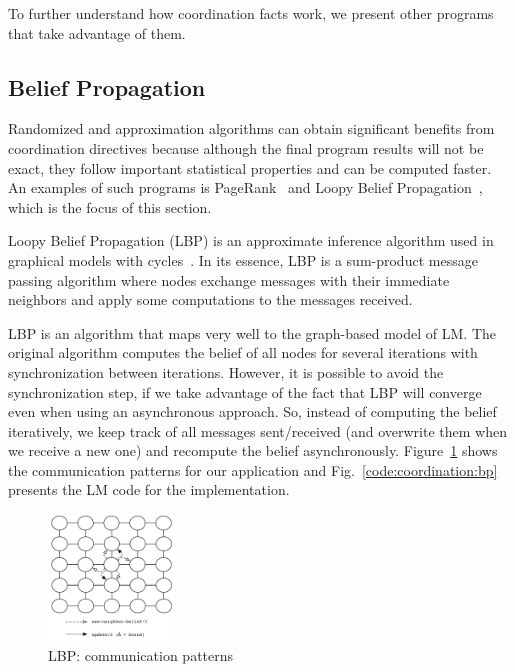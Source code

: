 To further understand how coordination facts work, we present other programs that
take advantage of them.

\subsection{Belief Propagation}

Randomized and approximation algorithms can obtain significant benefits from
coordination directives because although the final program results will not be
exact, they follow important statistical properties and can be computed faster.
An examples of such programs is PageRank~\cite{Lubachevsky:1986:CAA:4904.4801}
and Loopy Belief Propagation~\cite{Gonzalez+al:aistats09paraml}, which is the
focus of this section.

Loopy Belief Propagation (LBP) is an approximate inference algorithm used in
graphical models with cycles~\cite{Murphy99loopybelief}. In its essence, LBP is
a sum-product message passing algorithm where nodes exchange messages with their
immediate neighbors and apply some computations to the messages received.

LBP is an algorithm that maps very well to the graph-based model of LM. The
original algorithm computes the belief of all nodes for several iterations with
synchronization between iterations. However, it is possible to avoid the
synchronization step, if we take advantage of the fact that LBP will converge
even when using an asynchronous approach. So, instead of computing the belief
iteratively, we keep track of all messages sent/received (and overwrite them
when we receive a new one) and recompute the belief asynchronously.
Figure~\ref{fig:coordination:bp} shows the communication patterns for our
application and Fig.~\ref{code:coordination:bp} presents the LM code for the
implementation.

\begin{figure}[h]
   \begin{center}
      \includegraphics[width=0.3\textwidth]{figures/bp/bp.pdf}
   \end{center}
\caption{LBP: communication patterns}
\label{fig:coordination:bp}
\end{figure}


